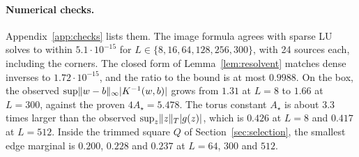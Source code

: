 \paragraph{Numerical checks.} Appendix~\ref{app:checks} lists them. The image formula agrees with sparse LU solves to within $5.1\cdot10^{-15}$ for $L\in\{8,16,64,128,256,300\}$, with 24 sources each, including the corners. The closed form of Lemma~\ref{lem:resolvent} matches dense inverses to $1.72\cdot10^{-15}$, and the ratio to the bound is at most $0.9988$. On the box, the observed $\sup\lVert w-b\rVert_\infty\lvert K^{-1}(w,b)\rvert$ grows from $1.31$ at $L=8$ to $1.66$ at $L=300$, against the proven $4A_\star=5.478$. The torus constant $A_\star$ is about $3.3$ times larger than the observed $\sup_z\lVert z\rVert_T\lvert g(z)\rvert$, which is $0.426$ at $L=8$ and $0.417$ at $L=512$. Inside the trimmed square $Q$ of Section~\ref{sec:selection}, the smallest edge marginal is $0.200$, $0.228$ and $0.237$ at $L=64$, $300$ and $512$.
